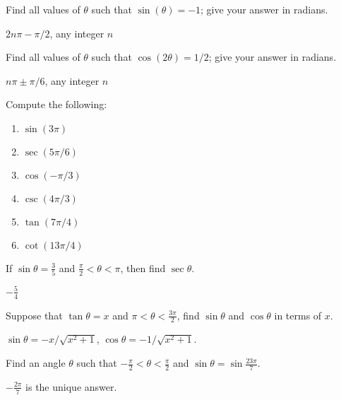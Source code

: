 \begin{enumialphparenastyle}

\begin{ex}
Find all values of $\theta$ such that
$\sin(\theta) = -1$; give your answer in radians.
\begin{sol}
$2n\pi-\pi/2$, any integer $n$
\end{sol}
\end{ex}

\begin{ex} 
Find all values of $\theta$ such that
$\cos(2\theta) = 1/2$; give your answer in radians.
\begin{sol}
$n\pi\pm\pi/6$, any integer $n$
\end{sol}
\end{ex}

\begin{ex} 
Compute the following:
\begin{multicols}{2}
\begin{enumerate}
	\item	$\sin(3\pi)$
	\item	$\sec(5\pi/6)$
	\item	$\cos(-\pi/3)$
	\item	$\csc(4\pi/3)$
	\item	$\tan(7\pi/4)$
	\item	$\cot(13\pi/4)$
\end{enumerate}
\end{multicols}
\end{ex}

\begin{ex}
If $\sin\theta=\frac{3}{5}$ and $\frac{\pi}{2}<\theta<\pi$, then find $\sec\theta$.
\begin{sol}
$-\frac{5}{4}$
\end{sol}
\end{ex}

\begin{ex}
Suppose that $\tan\theta=x$ and $\pi<\theta<\frac{3\pi}{2}$, find $\sin\theta$ and $\cos\theta$ in terms of $x$.
\begin{sol}
$\sin\theta=-x/\sqrt{x^{2}+1}$, $\cos\theta=-1/\sqrt{x^{2}+1}$.
\end{sol}
\end{ex}

\begin{ex}
Find an angle $\theta$ such that $-\frac{\pi}{2}<\theta<\frac{\pi}{2}$ and $\sin\theta=\sin\frac{23\pi}{7}$.
\begin{sol}
$-\frac{2\pi}{7}$ is the unique answer.
\end{sol}
\end{ex}



\end{enumialphparenastyle}

